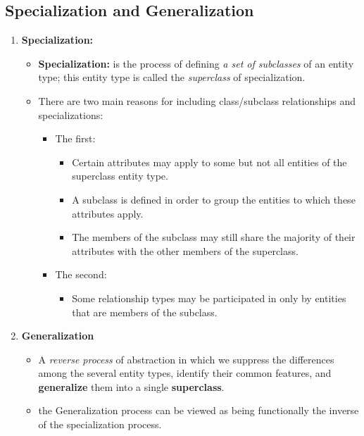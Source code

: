 \documentclass[10pt]{article}
\begin{document}
\subsection{Specialization and Generalization}
\begin{enumerate}
	\item \textbf{Specialization: }
	\begin{itemize}
		\item \textbf{Specialization:} is the process of defining \textit{a set of subclasses} of an entity type; this entity type is called the \textit{superclass} of specialization.
		\item There are two main reasons for including class/subclass relationships and specializations:
		\begin{itemize}
			\item The first:
			\begin{itemize}
				\item Certain attributes may apply to some but not all entities of the superclass entity type.
				\item A subclass is defined in order to group the entities to which these attributes apply.
				\item The members of the subclass may still share the majority of their attributes with the other members of the superclass.
			\end{itemize}

			\item The second:
			\begin{itemize}
				\item Some relationship types may be participated in only by entities that are members of the subclass.  
			\end{itemize}
		\end{itemize}
	\end{itemize}

	\item \textbf{Generalization}
	\begin{itemize}
		\item A \textit{reverse process} of abstraction in which we suppress the differences among the several entity types, identify their common features, and \textbf{generalize} them into a single \textbf{superclass}.
		\item the Generalization process can be viewed as being functionally the inverse of the specialization process.
	\end{itemize}
\end{enumerate}
\end{document}
